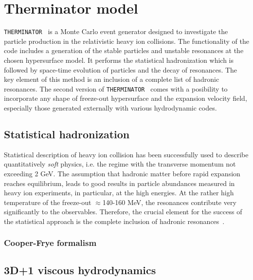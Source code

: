 \chapter{Therminator model}
  \verb|THERMINATOR|~\cite{therminator} is a Monte Carlo event generator designed to investigate the particle production in the relativistic heavy ion collisions.
  The functionality of the code includes a generation of the stable particles and unstable resonances at the chosen hypersurface model.
  It performs the statistical hadronization which is followed by space-time evolution of particles and the decay of resonances.
  The key element of this method is an inclusion of a complete list of hadronic resonances.
  The second version of \verb|THERMINATOR|~\cite{therminator2} comes with a posibility to incorporate any shape of freeze-out hypersurface and the expansion velocity field, especially those generated externally with various hydrodynamic codes.
  \section{Statistical hadronization}
    Statistical description of heavy ion collision has been successfully used to describe quantitatively \textit{soft} physics, i.e. the regime with the transverse momentum not exceeding 2 GeV.
    The assumption that hadronic matter before rapid expansion reaches equilibrium, leads to good results in particle abundances measured in heavy ion experiments, in particular, at the high energies.
    At the rather high temperature of the freeze-out $\approx$140-160 MeV, the resonances contribute very significantly to the observables.
    Therefore, the crucial element for the success of the statistical approach is the complete inclusion of hadronic resonances~\cite{therminator}.
    \subsection{Cooper-Frye formalism}

    \section{3D+1 viscous hydrodynamics}

